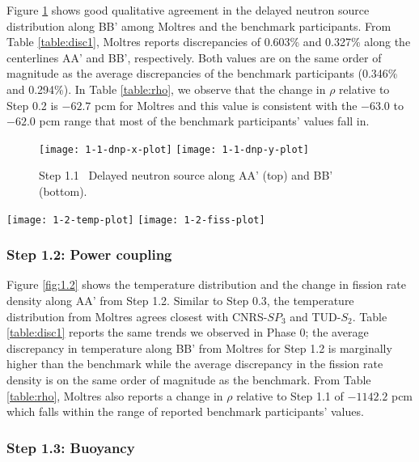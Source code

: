 Figure \ref{fig:1.1} shows good qualitative agreement in the delayed neutron
source distribution along BB' among Moltres and the benchmark participants.
From Table \ref{table:disc1}, Moltres reports discrepancies of 0.603\% and
0.327\% along the centerlines AA' and BB', respectively. Both values are on the
same order of magnitude as the average discrepancies of the benchmark
participants (0.346\% and 0.294\%).
In Table \ref{table:rho}, we observe that the change in
$\rho$ relative to Step 0.2 is $-62.7$ pcm for Moltres and this value is
consistent with the $-63.0$ to $-62.0$ pcm range that most of the benchmark
participants' values fall in.
%
\begin{figure}[h!]
	\centering
    \texttt{[image: 1-1-dnp-x-plot]}
    \texttt{[image: 1-1-dnp-y-plot]}
	\caption{Step 1.1 \textemdash\ Delayed neutron source along AA' (top) and BB'
	(bottom).}
	\label{fig:1.1}
\end{figure}
%
\begin{figure*}[htb]
	\centering
	\texttt{[image: 1-2-temp-plot]}
	\texttt{[image: 1-2-fiss-plot]}
	\caption{Step 1.2 \textemdash\ Temperature distribution and change in fission rate
	density along AA'.}
	\label{fig:1.2}
\end{figure*}

\FloatBarrier

\subsubsection{Step 1.2: Power coupling}

Figure \ref{fig:1.2} shows the temperature distribution and the change in
fission rate density along AA' from Step 1.2. Similar to Step 0.3, the
temperature distribution from Moltres agrees closest with CNRS-$SP_3$ and
TUD-$S_2$. Table \ref{table:disc1} reports the same trends we observed in Phase
0; the average discrepancy in temperature along BB' from Moltres for Step 1.2
is marginally higher than the benchmark while the average discrepancy in the
fission rate density is on the same order of magnitude as the benchmark.
From Table \ref{table:rho}, Moltres also reports a change in $\rho$
relative to Step 1.1 of $-1142.2$ pcm which
falls within the range of reported benchmark participants' values.

\subsubsection{Step 1.3: Buoyancy}

